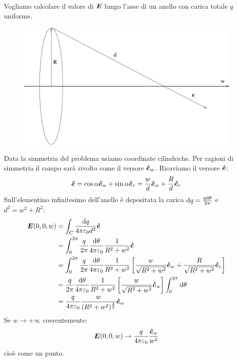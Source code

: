 \begin{Es}[Anello]
  \label{es:anello}
  Vogliamo calcolare il valore di $\boldsymbol{E}$ lungo l'asse di un anello con carica totale $q$ uniforme.
  \begin{figure}[htbp]
    \centering
    \includegraphics[scale=0.45]{immagini/fisica2/anello}
  \end{figure}
  Data la simmetria del problema usiamo coordinate cilindriche. Per ragioni di simmetria il campo sarà rivolto come il versore $\boldsymbol{\hat {e}}_w$. Ricaviamo il versore $\boldsymbol{\hat {e}}$:
  \[\boldsymbol{\hat {e}}=\cos\alpha\boldsymbol{\hat {e}}_w+\sin\alpha\boldsymbol{\hat {e}}_r=\frac{w}{d}\boldsymbol{\hat {e}}_w+\frac{R}{d}\boldsymbol{\hat {e}}_r\]
  Sull'elementino infinitesimo dell'anello è depositata la carica $\mathrm{d} q=\frac{q \mathrm{d} \theta}{2\pi}$ e $d^2=w^2+R^2$:
  \begin{align*}
    \boldsymbol{E}(0,0,w) & =\int_C\frac{\mathrm{d} q}{4\pi\varepsilon_0d^2}\boldsymbol{\hat {e}}                                                                                                                \\
                 & =\int_0^{2\pi}\frac{q}{2\pi}\frac{\mathrm{d}\theta}{4\pi\varepsilon_0}\frac{1}{R^2+w^2}\boldsymbol{\hat {e}}                                                                         \\
                 & =\int_0^{2\pi}\frac{q}{2\pi}\frac{\mathrm{d}\theta}{4\pi\varepsilon_0}\frac{1}{R^2+w^2}\left[\frac{w}{\sqrt{R^2+w^2}}\boldsymbol{\hat {e}}_w+\frac{R}{\sqrt{R^2+w^2}}\boldsymbol{\hat {e}}_r\right] \\
                 & =\frac{q}{2\pi}\frac{\mathrm{d}\theta}{4\pi\varepsilon_0}\frac{1}{R^2+w^2}\left[\frac{w}{\sqrt{R^2+w^2}}\boldsymbol{\hat {e}}_w\right]\int_0^{2\pi}\mathrm{d}\theta                         \\
                 & =\frac{q}{4\pi\varepsilon_0}\frac{w}{(R^2+w^2)^{\frac{3}{2}}}\boldsymbol{\hat {e}}_w                                                                                          \\
  \end{align*}
  Se $w\to +\infty$ coerentemente:
  \[\boldsymbol{E}(0,0,w)\to\frac{q}{4\pi\varepsilon_0}\frac{\boldsymbol{\hat {e}}_w}{w^2}\]
  cioè come un punto.
\end{Es}
